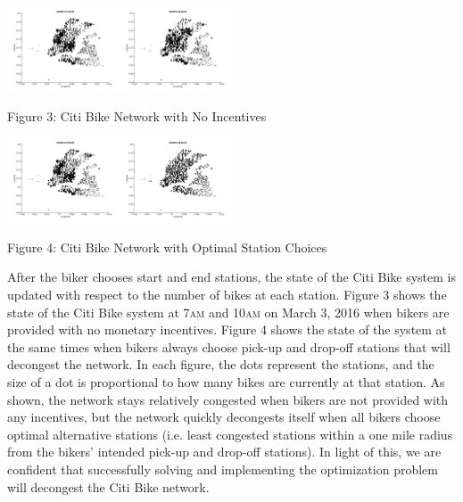 \documentclass[times, 10pt,twocolumn]{article}
\begin{document}
\hfill \break
\centerline{\includegraphics[width=0.25\textwidth]{m2/no_incentives_before.png}\includegraphics[width=0.25\textwidth]{m2/no_incentives_after.png}}
\centerline{Figure 3: Citi Bike Network with No Incentives}
\hfill \break
\centerline{\includegraphics[width=0.25\textwidth]{m2/incentives_before.png}\includegraphics[width=0.25\textwidth]{m2/incentives_after.png}}
\centerline{Figure 4: Citi Bike Network with Optimal Station Choices}
\hfill \break
\indent After the biker chooses start and end stations, the state of the Citi Bike system is updated with respect to the number of bikes at each station. Figure 3 shows the state of the Citi Bike system at 7\textsc{am} and 10\textsc{am} on March 3, 2016 when bikers are provided with no monetary incentives. Figure 4 shows the state of the system at the same times when bikers always choose pick-up and drop-off stations that will decongest the network. In each figure, the dots represent the stations, and the size of a dot is proportional to how many bikes are currently at that station. As shown, the network stays relatively congested when bikers are not provided with any incentives, but the network quickly decongests itself when all bikers choose optimal alternative stations (i.e. least congested stations within a one mile radius from the bikers' intended pick-up and drop-off stations). In light of this, we are confident that successfully solving and implementing the optimization problem will decongest the Citi Bike network.
\end{document}
